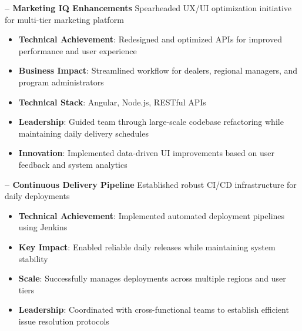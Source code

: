 \begin{sectionContainer}
	\vspace{0.4em}\noindent\large\textbf{– Marketing IQ Enhancements}
	\vspace{0.8em} \newline
	\noindent Spearheaded UX/UI optimization initiative for multi-tier marketing platform
	\begin{itemize}[leftmargin=*, nosep, itemsep=0.4em, before=\vspace{0.6em}, after=\vspace{0.8em}, label={}]
		\item \textbf{Technical Achievement}: Redesigned and optimized APIs for improved performance and user experience
		\item \textbf{Business Impact}: Streamlined workflow for dealers, regional managers, and program administrators
		\item \textbf{Technical Stack}: Angular, Node.js, RESTful APIs
		\item \textbf{Leadership}: Guided team through large-scale codebase refactoring while maintaining daily delivery schedules
		\item \textbf{Innovation}: Implemented data-driven UI improvements based on user feedback and system analytics
	\end{itemize}
\end{sectionContainer}

\begin{sectionContainer}
	\vspace{0.4em}\noindent\large\textbf{– Continuous Delivery Pipeline}
	\vspace{0.8em} \newline
	\noindent Established robust CI/CD infrastructure for daily deployments
	\begin{itemize}[leftmargin=*, nosep, itemsep=0.4em, before=\vspace{0.6em}, after=\vspace{0.8em}, label={}]
		\item \textbf{Technical Achievement}: Implemented automated deployment pipelines using Jenkins
		\item \textbf{Key Impact}: Enabled reliable daily releases while maintaining system stability
		\item \textbf{Scale}: Successfully manages deployments across multiple regions and user tiers
		\item \textbf{Leadership}: Coordinated with cross-functional teams to establish efficient issue resolution protocols
	\end{itemize}
\end{sectionContainer}

